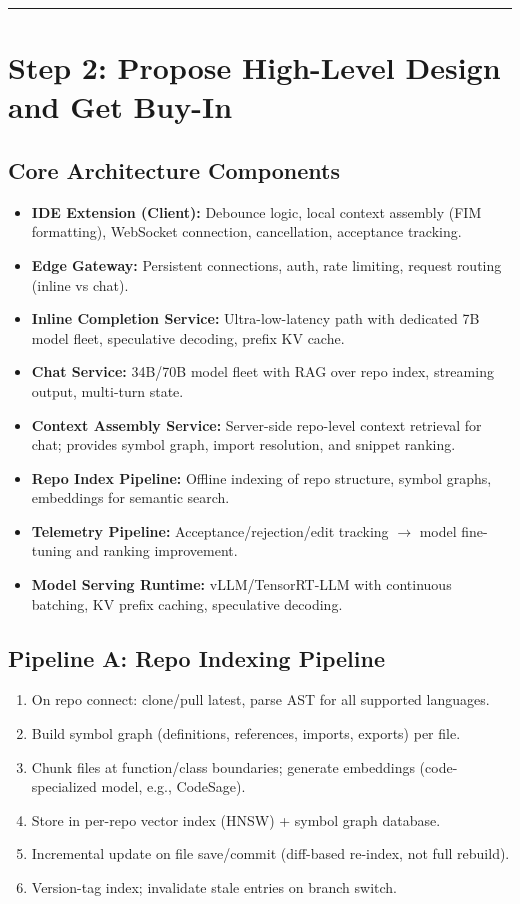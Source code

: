 \bigskip\hrule\bigskip

\section*{Step 2: Propose High-Level Design and Get Buy-In}

\subsection*{Core Architecture Components}

\begin{itemize}
  \item \textbf{IDE Extension (Client):} Debounce logic, local context assembly (FIM formatting), WebSocket connection, cancellation, acceptance tracking.
  \item \textbf{Edge Gateway:} Persistent connections, auth, rate limiting, request routing (inline vs chat).
  \item \textbf{Inline Completion Service:} Ultra-low-latency path with dedicated 7B model fleet, speculative decoding, prefix KV cache.
  \item \textbf{Chat Service:} 34B/70B model fleet with RAG over repo index, streaming output, multi-turn state.
  \item \textbf{Context Assembly Service:} Server-side repo-level context retrieval for chat; provides symbol graph, import resolution, and snippet ranking.
  \item \textbf{Repo Index Pipeline:} Offline indexing of repo structure, symbol graphs, embeddings for semantic search.
  \item \textbf{Telemetry Pipeline:} Acceptance/rejection/edit tracking $\rightarrow$ model fine-tuning and ranking improvement.
  \item \textbf{Model Serving Runtime:} vLLM/TensorRT-LLM with continuous batching, KV prefix caching, speculative decoding.
\end{itemize}

\subsection*{Pipeline A: Repo Indexing Pipeline}

\begin{enumerate}
  \item On repo connect: clone/pull latest, parse AST for all supported languages.
  \item Build symbol graph (definitions, references, imports, exports) per file.
  \item Chunk files at function/class boundaries; generate embeddings (code-specialized model, e.g., CodeSage).
  \item Store in per-repo vector index (HNSW) + symbol graph database.
  \item Incremental update on file save/commit (diff-based re-index, not full rebuild).
  \item Version-tag index; invalidate stale entries on branch switch.
\end{enumerate}


